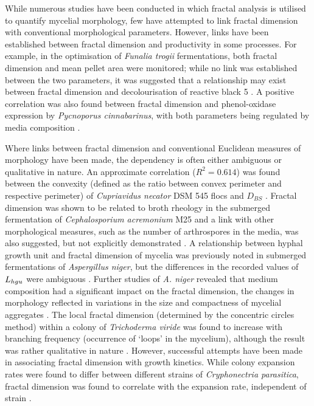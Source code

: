 While numerous studies have been conducted in which fractal analysis is utilised to quantify mycelial morphology, few have attempted to link fractal dimension with conventional morphological parameters. However, links have been established between fractal dimension and productivity in some processes. For example, in the optimisation of \emph{Funalia trogii} fermentations, both fractal dimension and mean pellet area were monitored; while no link was established between the two parameters, it was suggested that a relationship may exist between fractal dimension and decolourisation of reactive black 5 \cite{cpark2007}. A positive correlation was also found between fractal dimension and phenol-oxidase expression by \emph{Pycnoporus cinnabarinus}, with both parameters being regulated by media composition \cite{jones1997}.

Where links between fractal dimension and conventional Euclidean measures of morphology have been made, the dependency is often either ambiguous or qualitative in nature. An approximate correlation ($R^2=0.614$) was found between the convexity (defined as the ratio between convex perimeter and respective perimeter) of \emph{Cupriavidus necator} DSM 545 flocs and $D_{BS}$ \cite{finkler2007}. Fractal dimension was shown to be related to broth rheology in the submerged fermentation of \emph{Cephalosporium acremonium} M25 and a link with other morphological measures, such as the number of arthrospores in the media, was also suggested, but not explicitly demonstrated \cite{jckim2005}. A relationship between hyphal growth unit and fractal dimension of mycelia was previously noted in submerged fermentations of \emph{Aspergillus niger}, but the differences in the recorded values of $L_{hgu}$ were ambiguous \cite{ryoo1999}. Further studies of \emph{A. niger} revealed that medium composition had a significant impact on the fractal dimension, the changes in morphology reflected in variations in the size and compactness of mycelial aggregates \cite{papagianni2006b}. The local fractal dimension (determined by the concentric circles method) within a colony of \emph{Trichoderma viride} was found to increase with branching frequency (occurrence of \lq loops' in the mycelium), although the result was rather qualitative in nature \cite{hitchcock1996}. However, successful attempts have been made in associating fractal dimension with growth kinetics. While colony expansion rates were found to differ between different strains of \emph{Cryphonectria parasitica}, fractal dimension was found to correlate with the expansion rate, independent of strain \cite{golinski2008}.

